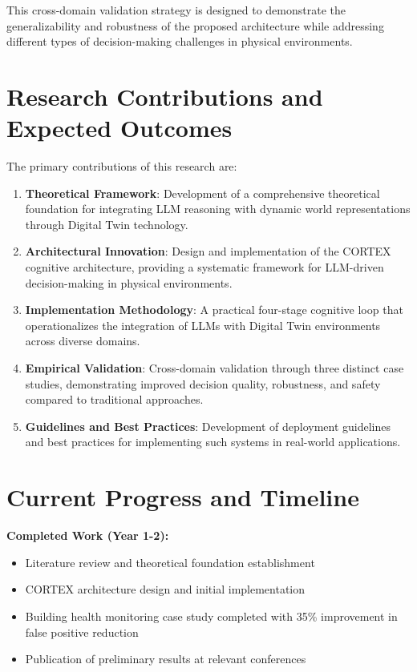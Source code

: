 This cross-domain validation strategy is designed to demonstrate the generalizability and robustness of the proposed architecture while addressing different types of decision-making challenges in physical environments.

\section{Research Contributions and Expected Outcomes}

The primary contributions of this research are:

\begin{enumerate}
    \item \textbf{Theoretical Framework}: Development of a comprehensive theoretical foundation for integrating LLM reasoning with dynamic world representations through Digital Twin technology.
    
    \item \textbf{Architectural Innovation}: Design and implementation of the CORTEX cognitive architecture, providing a systematic framework for LLM-driven decision-making in physical environments.
    
    \item \textbf{Implementation Methodology}: A practical four-stage cognitive loop that operationalizes the integration of LLMs with Digital Twin environments across diverse domains.
    
    \item \textbf{Empirical Validation}: Cross-domain validation through three distinct case studies, demonstrating improved decision quality, robustness, and safety compared to traditional approaches.
    
    \item \textbf{Guidelines and Best Practices}: Development of deployment guidelines and best practices for implementing such systems in real-world applications.
\end{enumerate}

\section{Current Progress and Timeline}

\textbf{Completed Work (Year 1-2):}
\begin{itemize}
    \item Literature review and theoretical foundation establishment
    \item CORTEX architecture design and initial implementation
    \item Building health monitoring case study completed with 35\% improvement in false positive reduction
    \item Publication of preliminary results at relevant conferences
\end{itemize}

